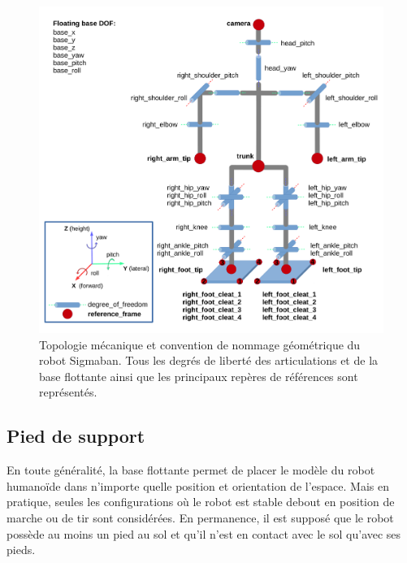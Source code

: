 \begin{figure}[htb!]
    \begin{center}
        \includegraphics[type=pdf,ext=.pdf,read=.pdf,width=\linewidth]{../schema/humanoid}
        \caption{\label{fig:humanoid}Topologie mécanique et convention 
        de nommage géométrique du robot Sigmaban. 
        Tous les degrés de liberté des articulations et de la base flottante 
        ainsi que les principaux repères de références sont représentés.}
    \end{center}
\end{figure}

\subsection{Pied de support\label{sec:support_foot}}

En toute généralité, la base flottante permet de placer
le modèle du robot humanoïde dans n'importe quelle position et orientation
de l'espace.
Mais en pratique, seules les configurations où le robot est stable debout 
en position de marche ou de tir sont considérées.
En permanence, il est supposé que le robot possède au moins 
un pied au sol et qu'il n'est en contact avec le sol qu'avec ses pieds.

